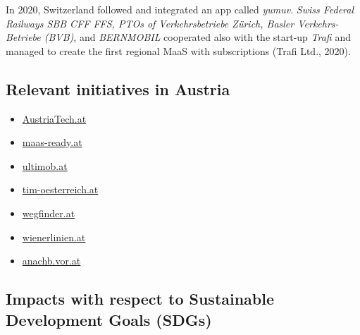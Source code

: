 \documentclass[
]{book}
\providecommand{\tightlist}{%
  \setlength{\itemsep}{0pt}\setlength{\parskip}{0pt}}
\begin{document}
In 2020, Switzerland followed and integrated an app called \emph{yumuv}. \emph{Swiss Federal Railways SBB CFF FFS, PTOs of Verkehrsbetriebe Zürich, Basler Verkehrs-Betriebe (BVB)}, and \emph{BERNMOBIL} cooperated also with the start-up \emph{Trafi} and managed to create the first regional MaaS with subscriptions (Trafi Ltd., 2020).

\hypertarget{relevant-initiatives-in-austria-10}{%
\subsection*{Relevant initiatives in Austria}\label{relevant-initiatives-in-austria-10}}

\begin{itemize}
\tightlist
\item
  \href{https://www.austriatech.at/assets/Uploads/Publikationen/PDF-Dateien/29fc02ada2/MaaS-miA_english_102019_web.pdf}{AustriaTech.at}
\item
  \href{https://maas-ready.at}{maas-ready.at}
\item
  \href{https://www.ultimob.at}{ultimob.at}
\item
  \href{https://www.tim-oesterreich.at/graz/}{tim-oesterreich.at}
\item
  \href{https://wegfinder.at/}{wegfinder.at}
\item
  \href{https://www.wienerlinien.at/eportal3/ep/channelView.do/pageTypeId/66526/channelId/-3600060}{wienerlinien.at}
\item
  \href{https://anachb.vor.at/}{anachb.vor.at}
\end{itemize}

\hypertarget{impacts-with-respect-to-sustainable-development-goals-sdgs-10}{%
\subsection*{Impacts with respect to Sustainable Development Goals (SDGs)}\label{impacts-with-respect-to-sustainable-development-goals-sdgs-10}}
\end{document}
